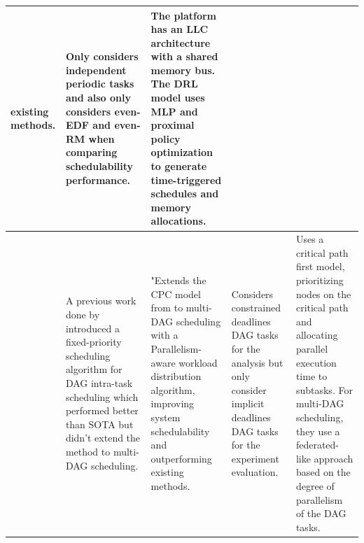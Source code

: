 \begin{table}
\begin{tabular}[]{|p{0.15in}|p{1.6in}|p{1.6in}|p{1.6in}|p{1.6in}|}
        existing methods. & Only considers independent periodic tasks
        and also only considers even-EDF and even-RM when comparing schedulability performance. &
        The platform has an LLC architecture with a shared memory bus. The DRL model uses MLP and proximal 
        policy optimization to generate time-triggered schedules and memory allocations.\\
        \hline
        \cite{Zhao2022DAGsched} & A previous work done by \citet{zhao2020DAGsched} introduced a fixed-priority scheduling 
        algorithm for DAG intra-task scheduling which performed better 
        than SOTA but didn't extend the method to multi-DAG scheduling. & 
        "Extends the CPC model from \citet{zhao2020DAGsched} to multi-DAG scheduling with a Parallelism-aware workload distribution algorithm, improving system schedulability and outperforming existing methods. & 
        Considers constrained deadlines DAG tasks for the analysis
        but only consider implicit deadlines DAG tasks for the experiment evaluation. & Uses a critical path first model, prioritizing nodes on the critical 
        path and allocating parallel execution time to subtasks. For multi-DAG scheduling, they use a federated-like approach based on the degree of parallelism of the DAG tasks.  \\
        \hline
    \end{tabular}
\end{table}
